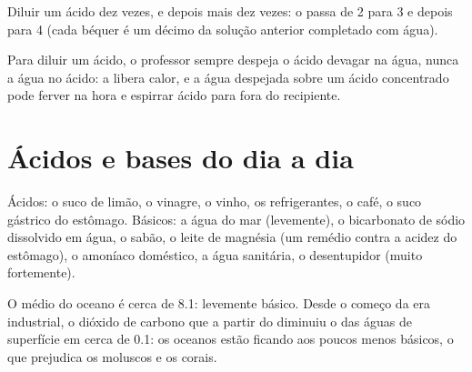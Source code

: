 \begin{omfigure}

{\small Diluir um ácido dez vezes, e depois mais dez vezes: o  passa de
2 para 3 e depois para 4 (cada béquer é um décimo da solução anterior
completado com água).}
\end{omfigure}

\begin{inthelab}
Para diluir um ácido, o professor sempre despeja o ácido devagar na
água, nunca a água no ácido: a  libera calor, e a água despejada
sobre um ácido concentrado pode ferver na hora e espirrar ácido para
fora do recipiente.
\end{inthelab}

\section{Ácidos e bases do dia a dia}

\begin{proposition}\label{prop:g9:acids-bases-ph:everyday}
Ácidos: o suco de limão, o vinagre, o vinho, os refrigerantes, o café, o
suco gástrico do estômago. Básicos: a água do mar (levemente), o
bicarbonato de sódio dissolvido em água, o sabão, o leite de magnésia
(um remédio contra a acidez do estômago), o amoníaco doméstico, a água
sanitária, o desentupidor (muito fortemente).
\end{proposition}

\begin{example}[O pH do oceano]\label{ex:g9:acids-bases-ph:ocean}
O  médio do oceano é cerca de 8.1: levemente básico. Desde o começo da
era industrial, o dióxido de carbono que  a partir do 
diminuiu o  das águas de superfície em cerca de 0.1: os oceanos estão
ficando aos poucos menos básicos, o que prejudica os moluscos e os
corais.
\end{example}

